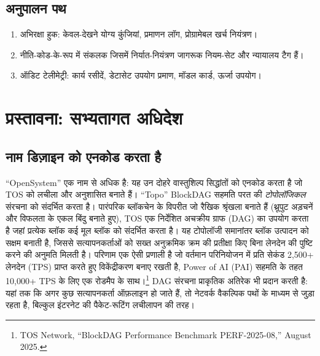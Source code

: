 \documentclass[11pt]{article}
\begin{document}
\subsection{अनुपालन पथ}
\begin{enumerate}[noitemsep]
  \item अभिरक्षा हुक: केवल-देखने योग्य कुंजियां, प्रमाणन लॉग, प्रोग्रामेबल खर्च नियंत्रण।
  \item नीति-कोड-के-रूप में संकलक जिसमें निर्यात-नियंत्रण जागरूक नियम-सेट और न्यायालय टैग हैं।
  \item ऑडिट टेलीमेट्री: कार्य रसीदें, डेटासेट उपयोग प्रमाण, मॉडल कार्ड, ऊर्जा उपयोग।
\end{enumerate}

\section{प्रस्तावना: सभ्यतागत अधिदेश}
\subsection{नाम डिज़ाइन को एनकोड करता है}
``OpenSystem'' एक नाम से अधिक है: यह उन दोहरे वास्तुशिल्प सिद्धांतों को एनकोड करता है जो TOS को लचीला और अनुशासित बनाते हैं। ``Topo'' BlockDAG सहमति परत की \emph{टोपोलॉजिकल} संरचना को संदर्भित करता है। पारंपरिक ब्लॉकचेन के विपरीत जो रैखिक श्रृंखला बनाते हैं (थ्रूपुट अड़चनें और विफलता के एकल बिंदु बनाते हुए), TOS एक निर्देशित अचक्रीय ग्राफ (DAG) का उपयोग करता है जहां प्रत्येक ब्लॉक कई मूल ब्लॉक को संदर्भित करता है। यह टोपोलॉजी समानांतर ब्लॉक उत्पादन को सक्षम बनाती है, जिससे सत्यापनकर्ताओं को सख्त अनुक्रमिक क्रम की प्रतीक्षा किए बिना लेनदेन की पुष्टि करने की अनुमति मिलती है। परिणाम एक ऐसी प्रणाली है जो वर्तमान परिनियोजन में प्रति सेकंड 2,500+ लेनदेन (TPS) प्राप्त करते हुए विकेंद्रीकरण बनाए रखती है, Power of AI (PAI) सहमति के तहत 10,000+ TPS के लिए एक रोडमैप के साथ।\footnote{TOS Network, ``BlockDAG Performance Benchmark PERF-2025-08,'' August 2025.} DAG संरचना प्राकृतिक अतिरेक भी प्रदान करती है: यहां तक कि अगर कुछ सत्यापनकर्ता ऑफ़लाइन हो जाते हैं, तो नेटवर्क वैकल्पिक पथों के माध्यम से जुड़ा रहता है, बिल्कुल इंटरनेट की पैकेट-रूटिंग लचीलापन की तरह।
\end{document}
